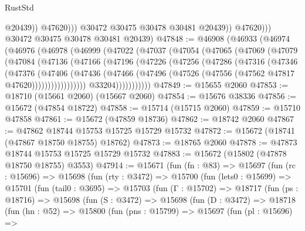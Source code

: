 \begin{lexlean}{RustStd}
\begin{coremodule}
                          @20439))
                      @47620)))
                @30472
                @30475
                @30478
                @30481
                @20439))
            @47620)))
      @30472
      @30475
      @30478
      @30481
      @20439)
@47848 := @46908
    (@46933
      (@46974
        (@46976
          (@46978
            (@46999
              (@47022
                (@47037
                  (@47054
                    (@47065
                      (@47069
                        (@47079
                          (@47084
                            (@47136
                              (@47166
                                (@47196
                                  (@47226
                                    (@47256
                                      (@47286
                                        (@47316
                                          (@47346
                                            (@47376
                                              (@47406
                                                (@47436
                                                  (@47466
                                                    (@47496
                                                      (@47526
                                                        (@47556
                                                          (@47562 @47817 @47620)))))))))))))))))
                          @33204)))))))))))
@47849 := @15655 @2060
@47853 := @18710 (@15661 @2060) (@15667 @2060)
@47854 := @15676 @38336
@47856 := @15672 (@47854 @18722)
@47858 := @15714 (@15715 @2060)
@47859 := @15710 @47858
@47861 := @15672 (@47859 @18736)
@47862 := @18742 @2060
@47867 := @47862 @18744 @15753 @15725 @15729 @15732
@47872 := @15672 (@18741 (@47867 @18750 @18755) @18762)
@47873 := @18765 @2060
@47878 := @47873 @18744 @15753 @15725 @15729 @15732
@47883 := @15672 (@15802 (@47878 @18750 @18755) @3553)
@47914 := @15671
    (fun (fn : @83) =>
    @15697
      (fun (rc : @15696) =>
      @15698
        (fun (rty : @3472) =>
        @15700
          (fun (lets0 : @15699) =>
          @15701
            (fun (tail0 : @3695) =>
            @15703
              (fun (Γ : @15702) =>
              @18717
                (fun (ps : @18716) =>
                @15698
                  (fun (S : @3472) =>
                  @15698
                    (fun (D : @3472) =>
                    @18718
                      (fun (hn : @52) =>
                      @15800
                        (fun (pns : @15799) =>
                        @15697
                          (fun (pl : @15696) =>

\end{coremodule}
\end{lexlean}
